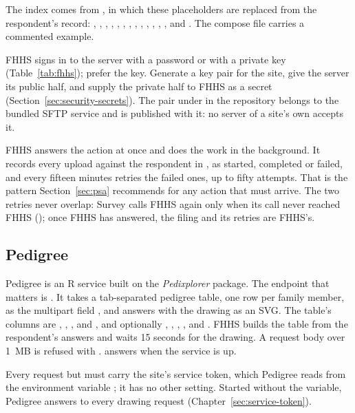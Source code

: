 \documentclass[11pt, a4paper]{article}
\begin{document}
The index comes from , in which these placeholders are
replaced from the respondent's record: , ,
, , , ,
, , , ,
, , ,  and
. The compose file carries a commented example.

FHHS signs in to the server with a password or with a private key (Table~\ref{tab:fhhs}); prefer
the key. Generate a key pair for the site, give the server its public half, and supply the
private half to FHHS as a secret (Section~\ref{sec:security-secrets}). The pair under
 in the repository belongs to the bundled SFTP service and is published with
it: no server of a site's own accepts it.

FHHS answers the action at once and does the work in the background. It records every upload
against the respondent in , as started, completed or failed, and
every fifteen minutes retries the failed ones, up to fifty attempts. That is the pattern
Section~\ref{sec:psa} recommends for any action that must arrive. The two retries never
overlap: Survey calls FHHS again only when its call never reached FHHS ();
once FHHS has answered, the filing and its retries are FHHS's.

\subsection{Pedigree}

Pedigree is an R service built on the \emph{Pedixplorer} package. The endpoint that matters is
. It takes a tab-separated pedigree table, one row per family member, as the
multipart field , and answers with the drawing as an SVG. The table's columns are
, , ,  and , and optionally ,
, , ,  and . FHHS
builds the table from the respondent's answers and waits 15 seconds for the drawing. A request
body over 1~MB is refused with .
 answers  when the service is up.

Every request but  must carry the site's service token, which Pedigree reads
from the environment variable ; it has no other setting. Started
without the variable, Pedigree answers  to every drawing request
(Chapter~\ref{sec:service-token}).
\end{document}
